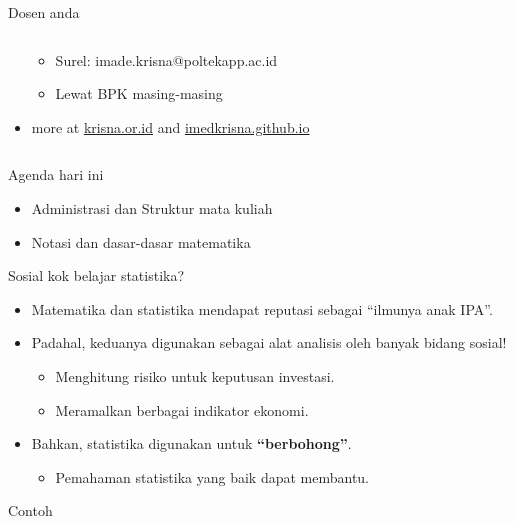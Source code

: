 \documentclass[
  ignorenonframetext,
]{beamer}
\providecommand{\tightlist}{%
  \setlength{\itemsep}{0pt}\setlength{\parskip}{0pt}}\usepackage{longtable,booktabs,array}
\begin{document}
\begin{frame}{Dosen anda}
\begin{columns}[T]
\begin{column}{0.6\textwidth}
\begin{itemize}
  \begin{itemize}
  \item
    Surel: imade.krisna@poltekapp.ac.id
  \item
    Lewat BPK masing-masing
  \end{itemize}
\item
  more at \href{https://krisna.or.id}{krisna.or.id} and
  \href{https://imedkrisna.github.io/}{imedkrisna.github.io}
\end{itemize}
\end{column}
\end{columns}
\end{frame}

\begin{frame}{Agenda hari ini}
\label{agenda-hari-ini}
\begin{itemize}
\item
  Administrasi dan Struktur mata kuliah
\item
  Notasi dan dasar-dasar matematika
\end{itemize}
\end{frame}

\begin{frame}{Sosial kok belajar statistika?}
\label{sosial-kok-belajar-statistika}
\begin{itemize}
\item
  Matematika dan statistika mendapat reputasi sebagai ``ilmunya anak
  IPA''.
\item
  Padahal, keduanya digunakan sebagai alat analisis oleh banyak bidang
  sosial!

  \begin{itemize}
  \item
    Menghitung risiko untuk keputusan investasi.
  \item
    Meramalkan berbagai indikator ekonomi.
  \end{itemize}
\item
  Bahkan, statistika digunakan untuk \textbf{``berbohong''}.

  \begin{itemize}
  \tightlist
  \item
    Pemahaman statistika yang baik dapat membantu.
  \end{itemize}
\end{itemize}
\end{frame}

\begin{frame}{Contoh}
\label{contoh}
\end{frame}
\end{document}
